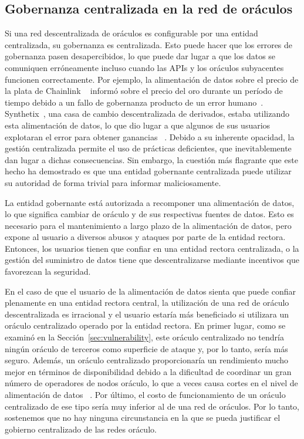 \documentclass[11pt]{article}
\begin{document}
\subsection{Gobernanza centralizada en la red de oráculos}
\label{sec:centralized-oracle-network-governance}

Si una red descentralizada de oráculos es configurable por una entidad centralizada, su gobernanza es centralizada. Esto puede hacer que los errores de gobernanza pasen desapercibidos, lo que puede dar lugar a que los datos se comuniquen erróneamente incluso cuando las APIs y los oráculos subyacentes funcionen correctamente. Por ejemplo, la alimentación de datos sobre el precio de la plata de Chainlink ~\cite{ellis:2017} informó sobre el precio del oro durante un período de tiempo debido a un fallo de gobernanza producto de un error humano~\cite{chainlink-fatfinger}.
Synthetix~\cite{synthetix:2020}, una casa de cambio descentralizada de derivados, estaba utilizando esta alimentación de datos, lo que dio lugar a que algunos de sus usuarios explotaran el error para obtener ganancias ~\cite{synthetix-fatfinger}.
Debido a su inherente opacidad, la gestión centralizada permite el uso de prácticas deficientes, que inevitablemente dan lugar a dichas consecuencias. Sin embargo, la cuestión más flagrante que este hecho ha demostrado es que una entidad gobernante centralizada puede utilizar su autoridad de forma trivial para informar maliciosamente.

La entidad gobernante está autorizada a recomponer una alimentación de datos, lo que significa cambiar de oráculo y de sus respectivas fuentes de datos. Esto es necesario para el mantenimiento a largo plazo de la alimentación de datos, pero expone al usuario a diversos abusos y ataques por parte de la entidad rectora. Entonces, los usuarios tienen que confiar en una entidad rectora centralizada, o la gestión del suministro de datos tiene que descentralizarse mediante incentivos que favorezcan la seguridad.

En el caso de que el usuario de la alimentación de datos sienta que puede confiar plenamente en una entidad rectora central, la utilización de una red de oráculo descentralizada es irracional y el usuario estaría más beneficiado si utilizara un oráculo centralizado operado por la entidad rectora. En primer lugar, como se examinó en la Sección~\ref{sec:vulnerability}, este oráculo centralizado no tendría ningún oráculo de terceros como superficie de ataque y, por lo tanto, sería más seguro. Además, un oráculo centralizado proporcionaría un rendimiento mucho mejor en términos de disponibilidad debido a la dificultad de coordinar un gran número de operadores de nodos oráculo, lo que a veces causa cortes en el nivel de alimentación de datos ~\cite{chainlink-outage}.
Por último, el costo de funcionamiento de un oráculo centralizado de ese tipo sería muy inferior al de una red de oráculos. Por lo tanto, sostenemos que no hay ninguna circunstancia en la que se pueda justificar el gobierno centralizado de las redes oráculo.
\end{document}
